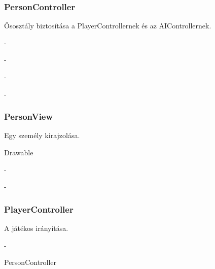 \subsubsection{PersonController}
\begin{class-template-responsibility}
    Ősosztály biztosítása a PlayerControllernek és az AIControllernek.
\end{class-template-responsibility}
\begin{class-template-interface}
    -
\end{class-template-interface}
\begin{class-template-baseclass}
    -
\end{class-template-baseclass}
\begin{class-template-attribute}
-
\end{class-template-attribute}
\begin{class-template-method}
-
\end{class-template-method}

\subsubsection{PersonView}
\begin{class-template-responsibility}
    Egy személy kirajzolása.
\end{class-template-responsibility}
\begin{class-template-interface}
    Drawable
\end{class-template-interface}
\begin{class-template-baseclass}
    -
\end{class-template-baseclass}
\begin{class-template-attribute}
\end{class-template-attribute}
\begin{class-template-method}
-
\end{class-template-method}

\subsubsection{PlayerController}
\begin{class-template-responsibility}
    A játékos irányítása.
\end{class-template-responsibility}
\begin{class-template-interface}
    -
\end{class-template-interface}
\begin{class-template-baseclass}
    PersonController
\end{class-template-baseclass}
\begin{class-template-attribute}
\end{class-template-attribute}
\begin{class-template-method}
\end{class-template-method}


